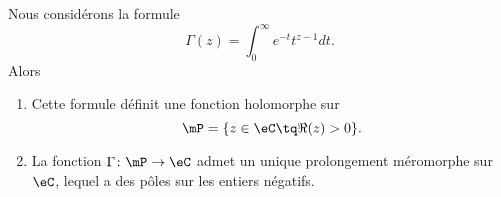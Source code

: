 \begin{theorem}   \label{ThoZJYooWKfbVz}
	Nous considérons la formule
	\begin{equation}
		\Gamma(z)=\int_0^{\infty} e^{-t}t^{z-1}dt.
	\end{equation}
	Alors
	\begin{enumerate}
		\item
		      Cette formule définit une fonction holomorphe sur
		      \begin{equation}
			      \mP=\{ z\in \eC\tq \Re(z)>0 \}.
		      \end{equation}
		\item
		      La fonction \( \Gamma\colon \mP\to \eC\) admet un unique prolongement méromorphe sur \( \eC\), lequel a des pôles sur les entiers négatifs.
	\end{enumerate}
\end{theorem}

